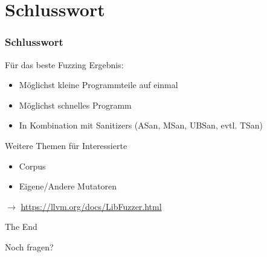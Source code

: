 \section{Schlusswort}
\begin{frame}[fragile]
	\frametitle{Schlusswort}

	Für das beste Fuzzing Ergebnis:
	\begin{itemize}
		\item Möglichst kleine Programmteile auf einmal
		\item Möglichst schnelles Programm
		\item In Kombination mit Sanitizers (ASan, MSan, UBSan, evtl. TSan)
	\end{itemize}

	Weitere Themen für Interessierte
	\begin{itemize}
		\item Corpus
		\item Eigene/Andere Mutatoren
	\end{itemize}
	$\rightarrow$ \url{https://llvm.org/docs/LibFuzzer.html}
\end{frame}


\begin{frame}
	\begin{figure}[ht]
		\centering
	\end{figure}
	\Huge{\centerline{The End}}
	\small{\centerline{Noch fragen?}}

\end{frame}
